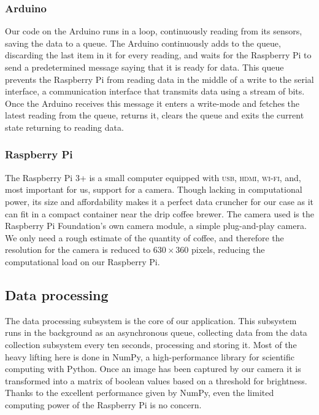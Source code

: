 \documentclass[12pt,a4paper,oneside,article]{memoir}
\numberwithin{equation}{chapter}
\begin{document}
\subsubsection{Arduino}\label{sec:arduino}
Our code on the Arduino runs in a loop, continuously reading from its sensors,
saving the data to a queue. The Arduino continuously adds to the queue,
discarding the last item in it for every reading, and waits for the Raspberry Pi
to send a predetermined message saying that it is ready for data. This queue
prevents the Raspberry Pi from reading data in the middle of a write to the
serial interface, a communication interface that transmits data using a stream
of bits. Once the Arduino receives this message it enters a write-mode and
fetches the latest reading from the queue, returns it, clears the queue and
exits the current state returning to reading data.

\subsubsection{Raspberry Pi}\label{sec:raspberry-pi}
The Raspberry Pi 3+ is a small computer equipped with \textsc{usb},
\textsc{hdmi}, \textsc{wi-fi}, and, most important for us, support for a camera.
Though lacking in computational power, its size and affordability makes it a
perfect data cruncher for our case as it can fit in a compact container near the
drip coffee brewer. The camera used is the Raspberry Pi Foundation's own camera
module, a simple plug-and-play camera. We only need a rough estimate of the
quantity of coffee, and therefore the resolution for the camera is reduced to
\(630 \times 360\) pixels, reducing the computational load on our Raspberry Pi.

\subsection{Data processing}\label{sec:data-processing}
The data processing subsystem is the core of our application. This subsystem
runs in the background as an asynchronous queue, collecting data from the data
collection subsystem every ten seconds, processing and storing it. Most of the
heavy lifting here is done in NumPy, a high-performance library for scientific
computing with Python. Once an image has been captured by our camera it is
transformed into a matrix of boolean values based on a threshold for brightness.
Thanks to the excellent performance given by NumPy, even the limited computing
power of the Raspberry Pi is no concern.
\end{document}
